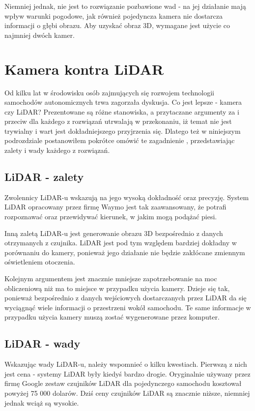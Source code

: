 Niemniej jednak, nie jest to rozwiązanie pozbawione wad - na jej działanie mają wpływ warunki pogodowe, jak również pojedyncza kamera nie dostarcza informacji o głębi obrazu. Aby uzyskać obraz 3D, wymagane jest użycie co najmniej dwóch kamer.

\section{Kamera kontra LiDAR}
Od kilku lat w środowisku osób zajmujących się rozwojem technologii samochodów autonomicznych trwa zagorzała dyskusja. Co jest lepsze - kamera czy LiDAR? Prezentowane są różne stanowiska, a przytaczane argumenty za i przeciw dla każdego z rozwiązań utrwalają w przekonaniu, iż temat nie jest trywialny i wart jest dokładniejszego przyjrzenia się. Dlatego też w niniejszym podrozdziale postanowiłem pokrótce omówić te zagadnienie \cite{autopilotReview:lidarVsCamera}, przedstawiając zalety i wady każdego z rozwiązań.

\subsection{LiDAR - zalety}
Zwolennicy LiDAR-u wskazują na jego wysoką dokładność oraz precyzję. System LiDAR opracowany przez firmę Waymo jest tak zaawansowany, że potrafi rozpoznawać oraz przewidywać kierunek, w jakim mogą podążać piesi.

Inną zaletą LiDAR-u jest generowanie obrazu 3D bezpośrednio z danych otrzymanych z czujnika. LiDAR jest pod tym względem bardziej dokładny w porównaniu do kamery, ponieważ jego działanie nie będzie zakłócane zmiennym oświetleniem otoczenia.

Kolejnym argumentem jest znacznie mniejsze zapotrzebowanie na moc obliczeniową niż ma to miejsce w przypadku użycia kamery. Dzieje się tak, ponieważ bezpośrednio z danych wejściowych dostarczanych przez LiDAR da się wyciągnąć wiele informacji o przestrzeni wokół samochodu. Te same informacje w przypadku użycia kamery muszą zostać wygenerowane przez komputer.

\subsection{LiDAR - wady}
Wskazując wady LiDAR-u, należy wspomnieć o kilku kwestiach. Pierwszą z nich jest cena - systemy LiDAR były kiedyś bardzo drogie. Oryginalnie używany przez firmę Google zestaw czujników LiDAR dla pojedynczego samochodu kosztował powyżej 75 000 dolarów. Dziś ceny czujników LiDAR są znacznie niższe, niemniej jednak wciąż są wysokie.

